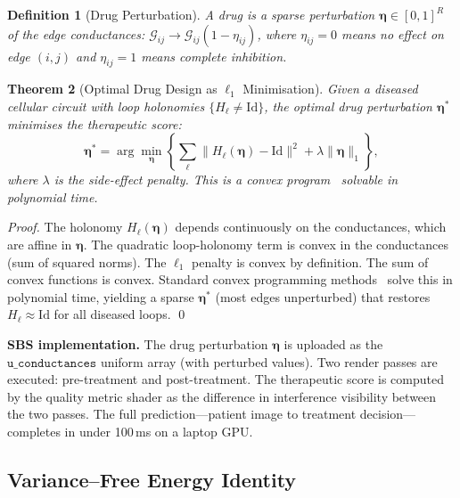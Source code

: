 \documentclass[11pt,twocolumn,a4paper]{article}
\newtheorem{theorem}{Theorem}[section]
\newtheorem{definition}[theorem]{Definition}
\newcommand{\Gcond}{\mathcal{G}}
\begin{document}
\begin{definition}[Drug Perturbation]
\label{def:drug}
A drug is a sparse perturbation $\boldsymbol{\eta} \in [0,1]^R$ of
the edge conductances: $\Gcond_{ij} \to \Gcond_{ij}(1 - \eta_{ij})$,
where $\eta_{ij} = 0$ means no effect on edge $(i,j)$ and
$\eta_{ij} = 1$ means complete inhibition.
\end{definition}

\begin{theorem}[Optimal Drug Design as $\ell_1$ Minimisation]
\label{thm:drug-design}
Given a diseased cellular circuit with loop holonomies
$\{H_\ell \neq \mathrm{Id}\}$, the optimal drug perturbation
$\boldsymbol{\eta}^*$ minimises the therapeutic score:
\begin{equation}
  \boldsymbol{\eta}^* = \arg\min_{\boldsymbol{\eta}}
  \left\{
    \sum_\ell \|H_\ell(\boldsymbol{\eta}) - \mathrm{Id}\|^2
    + \lambda \|\boldsymbol{\eta}\|_1
  \right\},
  \label{eq:drug-opt}
\end{equation}
where $\lambda$ is the side-effect penalty.  This is a convex
program~\citep{boyd2004} solvable in polynomial time.
\end{theorem}

\begin{proof}
The holonomy $H_\ell(\boldsymbol{\eta})$ depends continuously on the
conductances, which are affine in $\boldsymbol{\eta}$.  The quadratic
loop-holonomy term is convex in the conductances (sum of squared
norms).  The $\ell_1$ penalty is convex by definition.  The sum of
convex functions is convex.  Standard convex programming
methods~\citep{boyd2004} solve this in polynomial time, yielding a
sparse $\boldsymbol{\eta}^*$ (most edges unperturbed) that restores
$H_\ell \approx \mathrm{Id}$ for all diseased loops.  \qed
\end{proof}

\textbf{SBS implementation.}  The drug perturbation
$\boldsymbol{\eta}$ is uploaded as the
$\texttt{u\_conductances}$ uniform array (with perturbed values).
Two render passes are executed: pre-treatment and post-treatment.  The
therapeutic score is computed by the quality metric shader as the
difference in interference visibility between the two passes.  The
full prediction---patient image to treatment decision---completes in
under 100\,ms on a laptop GPU.

\subsection{Variance--Free Energy Identity}
\end{document}
